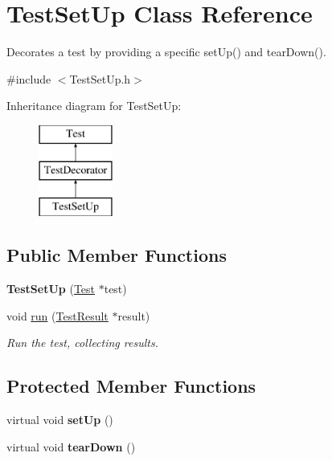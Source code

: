 \hypertarget{class_test_set_up}{\section{Test\-Set\-Up Class Reference}
\label{class_test_set_up}
}


Decorates a test by providing a specific set\-Up() and tear\-Down().  




{\ttfamily \#include $<$Test\-Set\-Up.\-h$>$}

Inheritance diagram for Test\-Set\-Up\-:\begin{figure}[H]
\begin{center}
\leavevmode
\includegraphics[height=3.000000cm]{class_test_set_up}
\end{center}
\end{figure}
\subsection*{Public Member Functions}
\begin{DoxyCompactItemize}
\item 
\hypertarget{class_test_set_up_af89f6399e1c84dd43ac43253a6550c44}{{\bfseries Test\-Set\-Up} (\hyperlink{class_test}{Test} $\ast$test)}\label{class_test_set_up_af89f6399e1c84dd43ac43253a6550c44}

\item 
\hypertarget{class_test_set_up_aa3f79125254c288d6effee6df8e7d5fb}{void \hyperlink{class_test_set_up_aa3f79125254c288d6effee6df8e7d5fb}{run} (\hyperlink{class_test_result}{Test\-Result} $\ast$result)}\label{class_test_set_up_aa3f79125254c288d6effee6df8e7d5fb}

\begin{DoxyCompactList}\small\item\em Run the test, collecting results. \end{DoxyCompactList}\end{DoxyCompactItemize}
\subsection*{Protected Member Functions}
\begin{DoxyCompactItemize}
\item 
\hypertarget{class_test_set_up_a9b40e24a51084e66a53fce52b4c6314b}{virtual void {\bfseries set\-Up} ()}\label{class_test_set_up_a9b40e24a51084e66a53fce52b4c6314b}

\item 
\hypertarget{class_test_set_up_aa935d1ec432a2d3f1be86c1172b1c028}{virtual void {\bfseries tear\-Down} ()}\label{class_test_set_up_aa935d1ec432a2d3f1be86c1172b1c028}

\end{DoxyCompactItemize}
